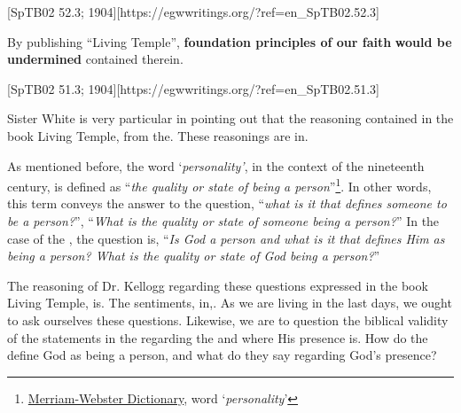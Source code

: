[SpTB02 52.3; 1904][https://egwwritings.org/?ref=en\_SpTB02.52.3]

By publishing “Living Temple”, \textbf{foundation principles of our faith} \textbf{would be undermined} contained therein. 

[SpTB02 51.3; 1904][https://egwwritings.org/?ref=en\_SpTB02.51.3]

Sister White is very particular in pointing out that the reasoning contained in the book Living Temple, from the. These reasonings are in.

As mentioned before, the word ‘\textit{personality’}, in the context of the nineteenth century, is defined as “\textit{the quality or state of being a person}”\footnote{\href{https://www.merriam-webster.com/dictionary/personality}{Merriam-Webster Dictionary}, word ‘\textit{personality}’}. In other words, this term conveys the answer to the question, “\textit{what is it that defines someone to be a person?}”, “\textit{What is the quality or state of someone being a person?}” In the case of the , the question is, “\textit{Is God a person and what is it that defines Him as being a person? What is the quality or state of God being a person?}”

The reasoning of Dr. Kellogg regarding these questions expressed in the book Living Temple, is. The sentiments, in,. As we are living in the last days, we ought to ask ourselves these questions. Likewise, we are to question the biblical validity of the statements in the  regarding the  and where His presence is. How do the  define God as being a person, and what do they say regarding God’s presence?

